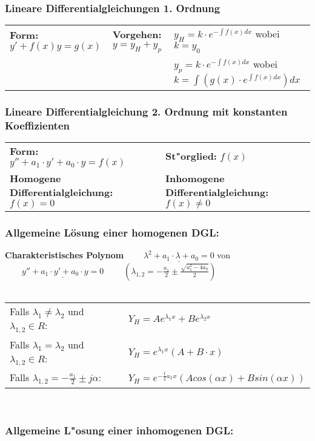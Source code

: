 	\subsubsection{Lineare Differentialgleichungen 1. Ordnung}
	\begin{tabular}{lll}
	\textbf{Form:} $ y'+f(x)y = g(x) $ &
	\textbf{Vorgehen:} $y=y_H+y_p$ &
	$y_H=k \cdot e^{-\int f(x) dx}$ wobei $k=y_0$\\ & &
	$y_p=k \cdot e^{-\int f(x) dx}$ wobei $k=\int(g(x) \cdot e^{\int f(x) dx}) dx$
	\end{tabular}
	
	\subsubsection{Lineare Differentialgleichung 2. Ordnung mit konstanten 
	Koeffizienten}
	\begin{tabular}{p{8cm}p{8cm}}
	\textbf{Form:} $y''+a_1\cdot y'+a_0\cdot y=f(x)$  &
	\textbf{St"orglied:} $f(x)$\\
	\textbf{Homogene Differentialgleichung:} $f(x)=0$ &
	\textbf{Inhomogene Differentialgleichung:} $f(x)\neq 0$
	\end{tabular}
	
	\subsubsection{Allgemeine Lösung einer homogenen DGL:\quad\subsubadd{$\quad
	Y_H$}}
	\textbf{Charakteristisches Polynom}
	$\qquad\underline{\lambda^2+a_1\cdot\lambda+a_0=0}$ \hspace{1cm}von
	$\qquad\underline{y''+a_1\cdot y'+a_0\cdot y=0}$ 
	$\qquad(\lambda_{1,2} = -\frac{a_1}{2} \pm \frac{\sqrt{a_1^2 - 4a_0}}{2})$\\ \\
	\begin{tabular}{p{8cm}p{8cm}}
	Falls $\lambda_1\neq \lambda_2$ und $\lambda_{1,2} \in R$:&
	$Y_H=Ae^{\lambda_1x}+Be^{\lambda_2x}$\\
	Falls $\lambda_1=\lambda_2$ und $\lambda_{1,2} \in R$:    &
	$Y_H=e^{\lambda_1x}(A+B\cdot x)$\\
	Falls $\lambda_{1,2}=-\frac{a_1}{2}\pm j\alpha$:          &
	$Y_H=e^{-\frac{1}{2}a_1x}(Acos(\alpha x) +Bsin(\alpha x))$\\
	\end{tabular}\\
	
	\subsubsection{Allgemeine L"osung einer inhomogenen DGL:\quad{}}
	
